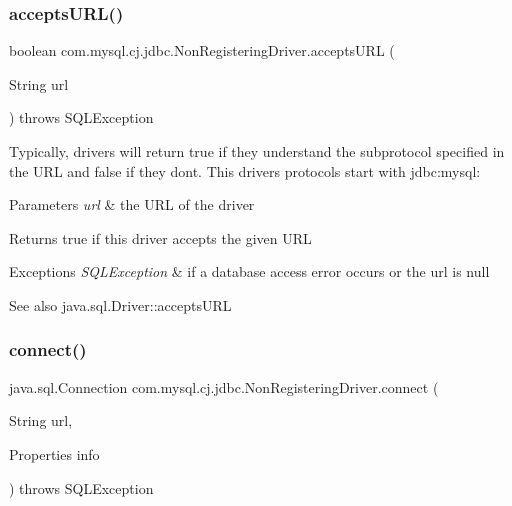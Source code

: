 \subsubsection{\texorpdfstring{accepts\+U\+R\+L()}{acceptsURL()}}
{\footnotesize\ttfamily boolean com.\+mysql.\+cj.\+jdbc.\+Non\+Registering\+Driver.\+accepts\+U\+RL (\begin{DoxyParamCaption}\item[{String}]{url }\end{DoxyParamCaption}) throws S\+Q\+L\+Exception}

Typically, drivers will return true if they understand the subprotocol specified in the U\+RL and false if they don\textquotesingle{}t. This driver\textquotesingle{}s protocols start with jdbc\+:mysql\+:


\begin{DoxyParams}{Parameters}
{\em url} & the U\+RL of the driver\\
\hline
\end{DoxyParams}
\begin{DoxyReturn}{Returns}
true if this driver accepts the given U\+RL
\end{DoxyReturn}

\begin{DoxyExceptions}{Exceptions}
{\em S\+Q\+L\+Exception} & if a database access error occurs or the url is null\\
\hline
\end{DoxyExceptions}
\begin{DoxySeeAlso}{See also}
java.\+sql.\+Driver\+::accepts\+U\+RL 
\end{DoxySeeAlso}
\mbox{\label{classcom_1_1mysql_1_1cj_1_1jdbc_1_1_non_registering_driver_ab3fd3d522550db032eab6c240b554e3e}} 
\subsubsection{\texorpdfstring{connect()}{connect()}}
{\footnotesize\ttfamily java.\+sql.\+Connection com.\+mysql.\+cj.\+jdbc.\+Non\+Registering\+Driver.\+connect (\begin{DoxyParamCaption}\item[{String}]{url,  }\item[{Properties}]{info }\end{DoxyParamCaption}) throws S\+Q\+L\+Exception}

